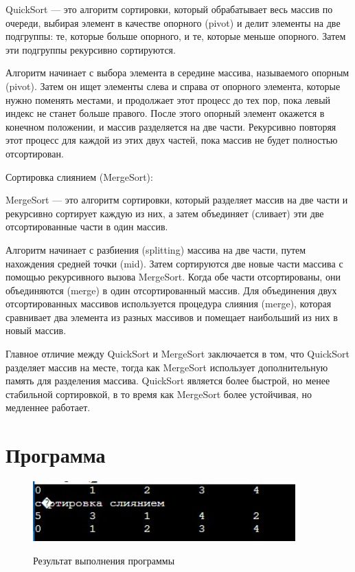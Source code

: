 \documentclass[14pt,a4paper]{scrartcl}
\begin{document}
QuickSort — это алгоритм сортировки, который обрабатывает весь массив по очереди, выбирая элемент в качестве опорного (pivot) и делит элементы на две подгруппы: те, которые больше опорного, и те, которые меньше опорного. Затем эти подгруппы рекурсивно сортируются.

Алгоритм начинает с выбора элемента в середине массива, называемого опорным (pivot). Затем он ищет элементы слева и справа от опорного элемента, которые нужно поменять местами, и продолжает этот процесс до тех пор, пока левый индекс не станет больше правого. После этого опорный элемент окажется в конечном положении, и массив разделяется на две части. Рекурсивно повторяя этот процесс для каждой из этих двух частей, пока массив не будет полностью отсортирован.

Сортировка слиянием (MergeSort):

MergeSort — это алгоритм сортировки, который разделяет массив на две части и рекурсивно сортирует каждую из них, а затем объединяет (сливает) эти две отсортированные части в один массив.

Алгоритм начинает с разбиения (splitting) массива на две части, путем нахождения средней точки (mid). Затем сортируются две новые части массива с помощью рекурсивного вызова MergeSort. Когда обе части отсортированы, они объединяются (merge) в один отсортированный массив. Для объединения двух отсортированных массивов используется процедура слияния (merge), которая сравнивает два элемента из разных массивов и помещает наибольший из них в новый массив.

Главное отличие между QuickSort и MergeSort заключается в том, что QuickSort разделяет массив на месте, тогда как MergeSort использует дополнительную память для разделения массива. QuickSort является более быстрой, но менее стабильной сортировкой, в то время как MergeSort более устойчивая, но медленнее работает.
\newpage


\section{Программа}


\begin{figure}[h!]
    \centering
    \includegraphics [width=0.9\textwidth]{result}\\
    \caption{Результат выполнения программы}
    \label{fig:picResult}
\end{figure}
\end{document}
